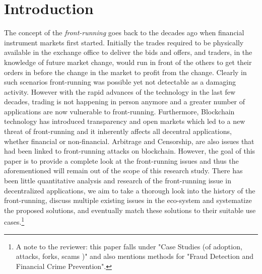 
\section{Introduction}
The concept of the \emph{front-running} goes back to the decades ago when financial instrument markets first started. Initially the trades required to be physically available in the exchange office to deliver the bids and offers, and traders, in the knowledge of future market change, would run in front of the others to get their orders in before the change in the market to profit from the change. Clearly in such scenarios front-running was possible yet not detectable as a damaging activity. However with the rapid advances of the technology in the last few decades, trading is not happening in person anymore and a greater number of applications are now vulnerable to front-running. Furthermore, Blockchain technology has introduced transparency and open markets which led to a new threat of front-running and it inherently affects all decentral applications, whether financial or non-financial. Arbitrage and Censorship, are also issues that had been linked to front-running attacks on blockchain. However, the goal of this paper is to provide a complete look at the front-running issues and thus the aforementioned will remain out of the scope of this research study. There has been little quantitative analysis and research of the front-running issue in decentralized applications, we aim to take a thorough look into the history of the front-running, discuss multiple existing issues in the eco-system and systematize the proposed solutions, and eventually match these solutions to their suitable use cases.\footnote{A note to the reviewer: this paper falls under "Case Studies (\eg of adoption, attacks, forks, scams \etc)" and also mentions methods for "Fraud Detection and Financial Crime Prevention". }





